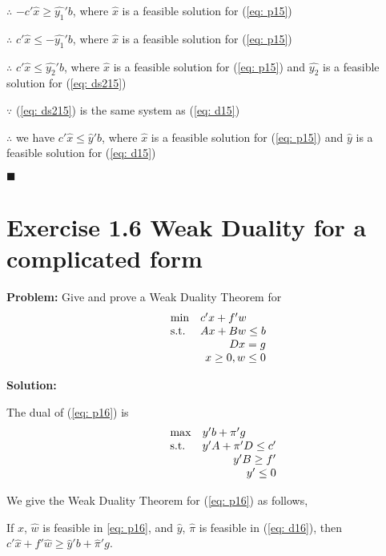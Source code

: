 $\therefore$  $ -c'\widehat{x} \geq \widehat{y_{1}}'b$, where $\widehat{x}$ is a feasible solution for (\ref{eq: p15})

$\therefore$  $ c'\widehat{x} \leq -\widehat{y_{1}}'b$, where $\widehat{x}$ is a feasible solution for (\ref{eq: p15})

$\therefore$  $ c'\widehat{x} \leq \widehat{y_{2}}'b$, where $\widehat{x}$ is a feasible solution for (\ref{eq: p15}) and $\widehat{y_{2}}$ is a feasible solution for (\ref{eq: ds215})

$\because$  (\ref{eq: ds215}) is the same system as (\ref{eq: d15})

$\therefore$ we have $ c'\widehat{x} \leq \widehat{y}'b$, where $\widehat{x}$ is a feasible solution for (\ref{eq: p15}) and $\widehat{y}$ is a feasible solution for (\ref{eq: d15})
\begin{flushright} $\blacksquare$ \end{flushright}


\section{Exercise 1.6 Weak Duality for a complicated form}
\textbf{Problem:} Give and prove a Weak Duality Theorem for 
\begin{equation}
\label{eq: p16}
  \begin{array}{lrcll}
    \min
    & \multicolumn{4}{l}{c'x+f'w} \\
    \text{s.t.}
    & Ax+Bw\leq b \\
    & Dx = g\\
    & x \geq 0, w\leq 0
  \end{array}
\end{equation}

\textbf{Solution:}

The dual of (\ref{eq: p16}) is 
\begin{equation}
\label{eq: d16}
  \begin{array}{lrcll}
    \max
    & \multicolumn{4}{l}{y'b+\pi 'g} \\
    \text{s.t.}
    & y'A+\pi ' D \leq c' \\
    & y'B \geq f' \\
    & y' \leq 0
  \end{array}
\end{equation}

We give the Weak Duality Theorem for (\ref{eq: p16}) as follows,
\begin{thm}
If $\widehat{x}$, $\widehat{w}$  is feasible in \ref{eq: p16}, and $\widehat{y}$, $\widehat{\pi}$ is feasible in (\ref{eq: d16}), then $c'\widehat{x}+f'\widehat{w} \geq \widehat{y}'b+\widehat{\pi }'g$.
\end{thm}


